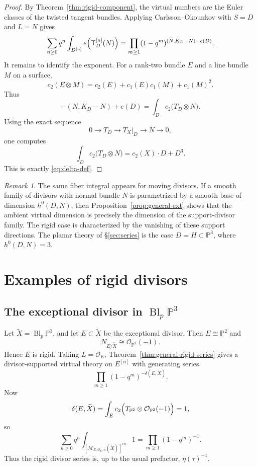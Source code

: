 \documentclass[12pt]{amsart}
\numberwithin{equation}{section}
\newcommand{\PP}{\mathbb{P}}
\newcommand{\OO}{\mathcal{O}}
\newcommand{\M}{\mathcal{M}}
\newcommand{\Ttw}{\mathsf{T}}
\newcommand{\vfc}[1]{[#1]^{\mathrm{vir}}}
\theoremstyle{plain}
\theoremstyle{definition}
\theoremstyle{remark}
\newtheorem{remark}[theorem]{Remark}
\begin{document}
\begin{proof}
By Theorem~\ref{thm:rigid-component}, the virtual numbers are the Euler classes of the twisted tangent bundles.
Applying Carlsson--Okounkov with $S=D$ and $L=N$ gives
\[
\sum_{n\ge 0}q^n\int_{D^{[n]}}e\Bigl(\Ttw_D^{[n]}(N)\Bigr)
=
\prod_{m\ge 1}(1-q^m)^{(N,K_D-N)-e(D)}.
\]
It remains to identify the exponent.
For a rank-two bundle $E$ and a line bundle $M$ on a surface,
\[
c_2(E\otimes M)=c_2(E)+c_1(E)c_1(M)+c_1(M)^2.
\]
Thus
\[
-(N,K_D-N)+e(D)=\int_D c_2\bigl(T_D\otimes N\bigr).
\]
Using the exact sequence
\[
0\to T_D\to T_X|_D\to N\to 0,
\]
one computes
\[
\int_D c_2\bigl(T_D\otimes N\bigr)=c_2(X)\cdot D+D^3.
\]
This is exactly \eqref{eq:delta-def}.
\end{proof}

\begin{remark}\label{rem:moving-vs-rigid}
The same fiber integral appears for moving divisors.
If a smooth family of divisors with normal bundle $N$ is parametrized by a smooth base of dimension $h^0(D,N)$, then Proposition~\ref{prop:general-ext} shows that the ambient virtual dimension is precisely the dimension of the support-divisor family.
The rigid case is characterized by the vanishing of these support directions.
The planar theory of \S\ref{sec:series} is the case $D=H\subset \PP^3$, where $h^0(D,N)=3$.
\end{remark}

\section{Examples of rigid divisors}\label{sec:examples}

\subsection{The exceptional divisor in $\operatorname{Bl}_p\PP^3$}
Let $\widetilde X=\operatorname{Bl}_p\PP^3$, and let $E\subset \widetilde X$ be the exceptional divisor.
Then $E\cong \PP^2$ and
\[
N_{E/\widetilde X}\cong \OO_{\PP^2}(-1).
\]
Hence $E$ is rigid.
Taking $L=\OO_E$, Theorem~\ref{thm:general-rigid-series} gives a divisor-supported virtual theory on $E^{[n]}$ with generating series
\[
\prod_{m\ge 1}(1-q^m)^{-\delta(E,\widetilde X)}.
\]
Now
\[
\delta(E,\widetilde X)=\int_E c_2\Bigl(T_{\PP^2}\otimes \OO_{\PP^2}(-1)\Bigr)=1,
\]
so
\begin{equation}\label{eq:blowup-series}
\sum_{n\ge 0}q^n\int_{\vfc{\M_{E,\OO_E,n}(\widetilde X)}}1
=
\prod_{m\ge 1}(1-q^m)^{-1}.
\end{equation}
Thus the rigid divisor series is, up to the usual prefactor, $\eta(\tau)^{-1}$.
\end{document}
